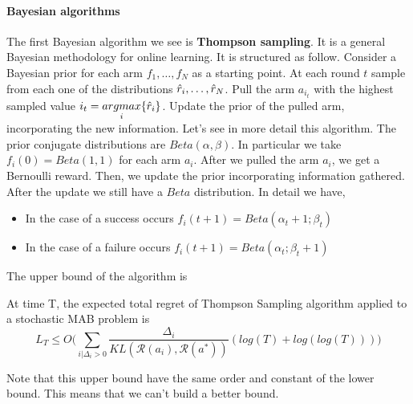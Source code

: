 \documentclass[../main.tex]{subfiles}
\begin{document}
\paragraph{Bayesian algorithms}
The first Bayesian algorithm we see is \textbf{Thompson sampling}. It is a general Bayesian methodology for online learning. It is structured as follow.
Consider a Bayesian prior for each arm $f_1,\dots,f_N$ as a starting point. At each round $t$ sample from each one of the distributions $\Hat{r}_i, \dots, \Hat{r}_N$. Pull the arm $a_{i_t}$ with the highest sampled value $i_t = \underset{i}{argmax} \{ \Hat{r}_i \}$. Update the prior of the pulled arm, incorporating the new information.
Let's see in more detail this algorithm. The prior conjugate distributions are $Beta(\alpha, \beta)$. In particular we take $f_i(0)=Beta(1,1)$ for each arm $a_i$. After we pulled the arm $a_i$, we get a Bernoulli reward. Then, we update the prior incorporating information gathered. After the update we still have a $Beta$ distribution. In detail we have,
\begin{itemize}
    \item In the case of a success occurs $f_i(t + 1) = Beta(\alpha_t + 1; \beta_t)$
    \item In the case of a failure occurs $f_i(t + 1) = Beta(\alpha_t; \beta_t + 1)$
\end{itemize}
The upper bound of the algorithm is
\begin{theorem}
    At time T, the expected total regret of Thompson Sampling algorithm applied
    to a stochastic MAB problem is
    \begin{equation*}
        L_T \leq O \Bigg( \sum_{i|\Delta_i > 0} \frac{\Delta_i}{KL(\mathcal{R}(a_i),\mathcal{R}(a^*))} (log(T) + log(log(T))) \Bigg)
    \end{equation*}
\end{theorem}
Note that this upper bound have the same order and constant of the lower bound. This means that we can't build a better bound.
\end{document}
